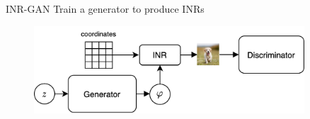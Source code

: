 \documentclass[10pt, handout]{beamer}
\begin{document}
\begin{frame}{INR-GAN}
Train a generator to produce INRs
    \begin{figure}
        \centering
        \includegraphics[width=0.9\textwidth]{images/inr-gan}
    \end{figure}
\end{frame}
\end{document}
